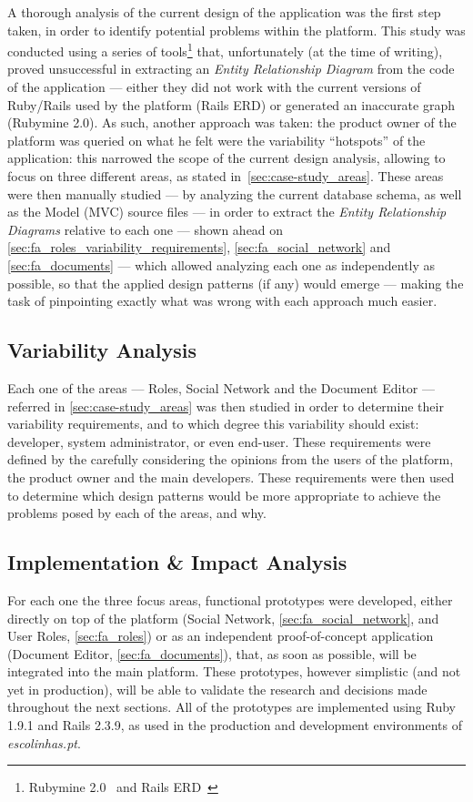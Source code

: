A thorough analysis of the current design of the application was the first step taken, in order to identify potential problems within the platform. This study was conducted using a series of tools\footnote{Rubymine 2.0~\cite{rubymine} and Rails ERD~\cite{rails_erd}} that, unfortunately (at the time of writing), proved unsuccessful in extracting an \emph{Entity Relationship Diagram} from the code of the application --- either they did not work with the current versions of Ruby/Rails used by the platform (Rails ERD) or generated an inaccurate graph (Rubymine 2.0). As such, another approach was taken: the product owner of the platform was queried on what he felt were the variability ``hotspots'' of the application: this narrowed the scope of the current design analysis, allowing to focus on three different areas, as stated in~\ref{sec:case-study_areas}. These areas were then manually studied --- by analyzing the current database schema, as well as the Model (MVC) source files --- in order to extract the \emph{Entity Relationship Diagrams} relative to each one --- shown ahead on \ref{sec:fa_roles_variability_requirements}, \ref{sec:fa_social_network} and \ref{sec:fa_documents} --- which allowed analyzing each one as independently as possible, so that the applied design patterns (if any) would emerge --- making the task of pinpointing exactly what was wrong with each approach much easier.

\subsection{Variability Analysis}\label{sec:variability_analysis}

Each one of the areas --- Roles, Social Network and the Document Editor --- referred in \ref{sec:case-study_areas} was then studied in order to determine their variability requirements, and to which degree this variability should exist: developer, system administrator, or even end-user. These requirements were defined by the carefully considering the opinions from the users of the platform, the product owner and the main developers. These requirements were then used to determine which design patterns would be more appropriate to achieve the problems posed by each of the areas, and why.

\subsection{Implementation \& Impact Analysis}

For each one the three focus areas, functional prototypes were developed, either directly on top of the platform (Social Network, \ref{sec:fa_social_network}, and User Roles, \ref{sec:fa_roles}) or as an independent proof-of-concept application (Document Editor, \ref{sec:fa_documents}), that, as soon as possible, will be integrated into the main platform. These prototypes, however simplistic (and not yet in production), will be able to validate the research and decisions made throughout the next sections. All of the prototypes are implemented using Ruby 1.9.1 and Rails 2.3.9, as used in the production and development environments of \emph{escolinhas.pt}.

